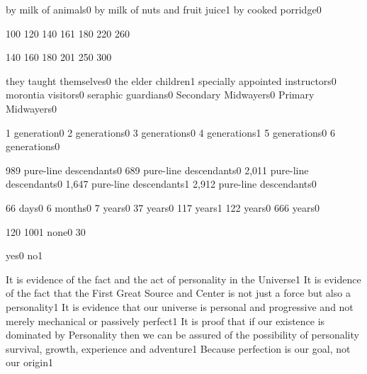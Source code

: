{by milk of animals}{0}
{by milk of nuts and fruit juice}{1}
{by cooked porridge}{0}
\qstop

{10}{0}
{12}{0}
{14}{0}
{16}{1}
{18}{0}
{22}{0}
{26}{0}
\qstop

{14}{0}
{16}{0}
{18}{0}
{20}{1}
{25}{0}
{30}{0}
\qstop

{they taught themselves}{0}
{the elder children}{1}
{specially appointed instructors}{0}
{morontia visitors}{0}
{seraphic guardians}{0}
{Secondary Midwayers}{0}
{Primary Midwayers}{0}
\qstop

{1 generation}{0}
{2 generations}{0}
{3 generations}{0}
{4 generations}{1}
{5 generations}{0}
{6 generations}{0}
\qstop

{989 pure\hyp{}line descendants}{0}
{689 pure\hyp{}line descendants}{0}
{2,011 pure\hyp{}line descendants}{0}
{1,647 pure\hyp{}line descendants}{1}
{2,912 pure\hyp{}line descendants}{0}
\qstop

{66 days}{0}
{6 months}{0}
{7 years}{0}
{37 years}{0}
{117 years}{1}
{122 years}{0}
{666 years}{0}
\qstop

{12}{0}
{100}{1}
{none}{0}
{3}{0}
\qstop


{yes}{0}
{no}{1}
\qstop

{It is evidence of the fact and the act of personality in the Universe}{1}
{It is evidence of the fact that the First Great Source and Center is not just a force but also a personality}{1}
{It is evidence that our universe is personal and progressive and not merely mechanical or passively perfect}{1}
{It is proof that if our existence is dominated by Personality then we can be assured of the possibility of personality survival, growth, experience and adventure}{1}
{Because perfection is our goal, not our origin}{1}
\qstop

